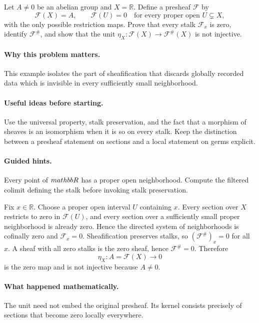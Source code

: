 \begin{problem}
Let $A\neq 0$ be an abelian group and $X=\mathbb R$. Define a presheaf $\mathcal F$ by
\[
\mathcal F(X)=A,\qquad \mathcal F(U)=0\quad\text{for every proper open }U\subsetneq X,
\]
with the only possible restriction maps. Prove that every stalk $\mathcal F_x$ is zero, identify $\mathcal F^\#$, and show that the unit
$\eta_X:\mathcal F(X)\to\mathcal F^\#(X)$ is not injective.
\end{problem}

\paragraph{Why this problem matters.}
This example isolates the part of sheafification that discards globally recorded data which is invisible in every sufficiently small neighborhood.

\paragraph{Useful ideas before starting.}
Use the universal property, stalk preservation, and the fact that a morphism of sheaves is an isomorphism when it is so on every stalk.  Keep the distinction between a presheaf statement on sections and a local statement on germs explicit.

\paragraph{Guided hints.}
Every point of $\\mathbb R$ has a proper open neighborhood.  Compute the filtered colimit defining the stalk before invoking stalk preservation.

\ifdefined\FullProblemDossiers
\begin{solution}
Fix $x\in\mathbb R$. Choose a proper open interval $U$ containing $x$. Every section over $X$ restricts to zero in $\mathcal F(U)$, and every section over a sufficiently small proper neighborhood is already zero. Hence the directed system of neighborhoods is cofinally zero and $\mathcal F_x=0$. Sheafification preserves stalks, so $(\mathcal F^\#)_x=0$ for all $x$. A sheaf with all zero stalks is the zero sheaf, hence $\mathcal F^\#=0$. Therefore
\[
\eta_X:A=\mathcal F(X)\longrightarrow 0
\]
is the zero map and is not injective because $A\ne0$.
\end{solution}

\paragraph{What happened mathematically.}
The unit need not embed the original presheaf.  Its kernel consists precisely of sections that become zero locally everywhere.

